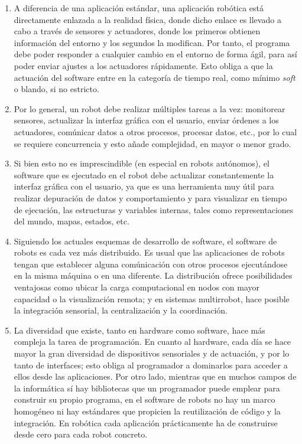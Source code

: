 \begin{enumerate}
	\itemsep1pt \parskip1pt 
	\item A diferencia de una aplicación estándar, una aplicación robótica está directamente enlazada a la realidad física, donde dicho enlace es llevado a cabo a través de sensores y actuadores, donde los primeros obtienen información del entorno y los segundos la modifican. Por tanto, el programa debe poder responder a cualquier cambio en el entorno de forma ágil, para así poder enviar ajustes a los actuadores rápidamente. Esto obliga a que la actuación del software entre en la categoría de tiempo real, como mínimo \textit{soft} o blando, si no estricto.

	\item Por lo general, un robot debe realizar múltiples tareas a la vez: monitorear sensores, actualizar la interfaz gráfica con el usuario, enviar órdenes a los actuadores, comúnicar datos a otros procesos, procesar datos, etc., por lo cual se requiere concurrencia y esto añade complejidad, en mayor o menor grado.

	\item Si bien esto no es imprescindible (en especial en robots autónomos), el software que es ejecutado en el robot debe actualizar constantemente la interfaz gráfica con el usuario, ya que es una herramienta muy útil para realizar depuración de datos y comportamiento y para visualizar en tiempo de ejecución, las estructuras y variables internas, tales como representaciones del mundo, mapas, estados, etc.

	\item Siguiendo los actuales esquemas de desarrollo de software, el software de robots es cada vez más distribuido. Es usual que las aplicaciones de robots tengan que establecer alguna comúnicación con otros procesos ejecutándose en la misma máquina o en una diferente. La distribución ofrece posibilidades ventajosas como ubicar la carga computacional en nodos con mayor capacidad o la visualización remota; y en sistemas multirrobot, hace posible la integración sensorial, la centralización y la coordinación.

	\item La diversidad que existe, tanto en hardware como software, hace más compleja la tarea de programación. En cuanto al hardware, cada día se hace mayor la gran diversidad de dispositivos sensoriales y de actuación, y por lo tanto de interfaces; esto obliga al programador a dominarlos para acceder a ellos desde las aplicaciones. Por otro lado, mientras que en muchos campos de la informática sí hay bibliotecas que un programador puede emplear para construir su propio programa, en el software de robots no hay un marco homogéneo ni hay estándares que propicien la reutilización de código y la integración. En robótica cada aplicación prácticamente ha de construirse desde cero para cada robot concreto.


\end{enumerate}

